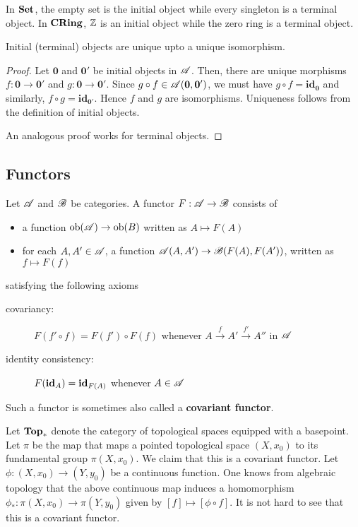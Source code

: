 In $\mathbf{Set}$, the empty set is the initial object while every singleton is a terminal object. In $\mathbf{CRing}$, $\mathbb{Z}$ is an initial object while the zero ring is a terminal object.

\begin{proposition}
    Initial (terminal) objects are unique upto a unique isomorphism.
\end{proposition}
\begin{proof}
    Let $\mathbf 0$ and $\mathbf 0'$ be initial objects in $\mathscr{A}$. Then, there are unique morphisms $f:\mathbf 0\to\mathbf 0'$ and $g:\mathbf 0\to\mathbf 0'$. Since $g\circ f\in\mathscr{A}(\mathbf 0,\mathbf 0')$, we must have $g\circ f = \mathbf{id}_{\mathbf 0}$ and similarly, $f\circ g = \mathbf{id}_{\mathbf 0'}$. Hence $f$ and $g$ are isomorphisms. Uniqueness follows from the definition of initial objects.

    An analogous proof works for terminal objects.
\end{proof}


\subsection{Functors}

\begin{definition}[Functor]
    Let $\mathscr{A}$ and $\mathscr{B}$ be categories. A functor $F:\mathscr{A}\to\mathscr{B}$ consists of 
    \begin{itemize}
        \item a function $\operatorname{ob}(\mathscr{A})\to\operatorname{ob}(B)$ written as $A\mapsto F(A)$
        \item for each $A,A'\in\mathscr{A}$, a function $\mathscr{A}(A,A')\to\mathscr{B}(F(A),F(A'))$, written as $f\mapsto F(f)$
    \end{itemize}

    \noindent satisfying the following axioms
    \begin{description}
        \item[covariancy:] $F(f'\circ f) = F(f')\circ F(f)$ whenever $A\stackrel{f}{\longrightarrow} A'\stackrel{f'}{\longrightarrow}A''$ in $\mathscr{A}$ 
        \item[identity consistency:] $F(\mathbf{id}_A) = \mathbf{id}_{F(A)}$ whenever $A\in\mathscr{A}$ 
    \end{description}

    Such a functor is sometimes also called a \textbf{covariant functor}.
\end{definition}

Let $\mathbf{Top}_*$ denote the category of topological spaces equipped with a basepoint. Let $\pi$ be the map that maps a pointed topological space $(X,x_0)$ to its fundamental group $\pi(X,x_0)$. We claim that this is a covariant functor. Let $\phi: (X,x_0)\to(Y,y_0)$ be a continuous function. One knows from algebraic topology that the above continuous map induces a homomorphism $\phi_*:\pi(X,x_0)\to\pi(Y,y_0)$ given by $[f]\mapsto[\phi\circ f]$. It is not hard to see that this is a covariant functor.

